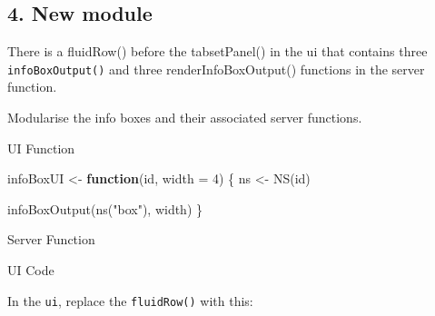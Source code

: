 \documentclass[
]{book}
\newenvironment{Shaded}{\begin{snugshade}}{\end{snugshade}}
\newcommand{\AttributeTok}[1]{\textcolor[rgb]{0.77,0.63,0.00}{#1}}
\newcommand{\ControlFlowTok}[1]{\textcolor[rgb]{0.13,0.29,0.53}{\textbf{#1}}}
\newcommand{\DecValTok}[1]{\textcolor[rgb]{0.00,0.00,0.81}{#1}}
\newcommand{\FunctionTok}[1]{\textcolor[rgb]{0.00,0.00,0.00}{#1}}
\newcommand{\NormalTok}[1]{#1}
\newcommand{\OtherTok}[1]{\textcolor[rgb]{0.56,0.35,0.01}{#1}}
\newcommand{\SpecialCharTok}[1]{\textcolor[rgb]{0.00,0.00,0.00}{#1}}
\newcommand{\StringTok}[1]{\textcolor[rgb]{0.31,0.60,0.02}{#1}}
\begin{document}
\hypertarget{new-module}{%
\subsection{4. New module}\label{new-module}}

There is a fluidRow() before the tabsetPanel() in the ui that contains three \texttt{infoBoxOutput()} and three renderInfoBoxOutput() functions in the server function.

Modularise the info boxes and their associated server functions.

UI Function

\begin{Shaded}
\begin{Highlighting}[]
\NormalTok{infoBoxUI }\OtherTok{\textless{}{-}} \ControlFlowTok{function}\NormalTok{(id, }\AttributeTok{width =} \DecValTok{4}\NormalTok{) \{}
\NormalTok{    ns }\OtherTok{\textless{}{-}} \FunctionTok{NS}\NormalTok{(id)}

    \FunctionTok{infoBoxOutput}\NormalTok{(}\FunctionTok{ns}\NormalTok{(}\StringTok{"box"}\NormalTok{), width)}
\NormalTok{\}}
\end{Highlighting}
\end{Shaded}

Server Function

\begin{Shaded}
\end{Shaded}

UI Code

In the \texttt{ui}, replace the \texttt{fluidRow()} with this:
\end{document}
